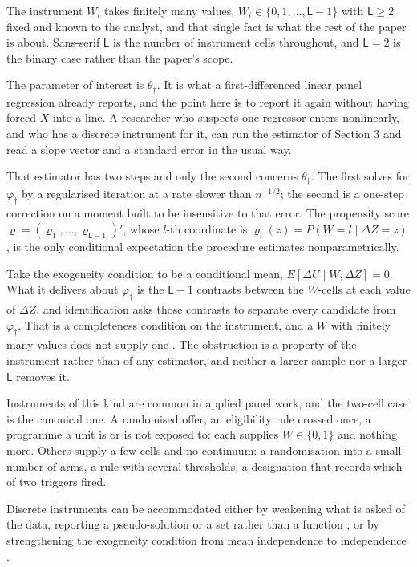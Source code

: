 \documentclass[
  12pt]{article}
\newcommand{\1}[1]{\mathds{1}\left[#1\right]}
\theoremstyle{plain}
\theoremstyle{definition}
\theoremstyle{definition}
\theoremstyle{remark}
\newcommand{\vdagger}{\varphi_{\dagger}}
\begin{document}
The instrument \(W_i\) takes finitely many values,
\(W_i\in\{0,1,\dots,\mathsf L-1\}\) with \(\mathsf L\ge2\) fixed and
known to the analyst, and that single fact is what the rest of the paper
is about. Sans-serif \(\mathsf L\) is the number of instrument cells
throughout, and \(\mathsf L=2\) is the binary case rather than the
paper's scope.

The parameter of interest is \(\theta_\dagger\). It is what a
first-differenced linear panel regression already reports, and the point
here is to report it again without having forced \(X\) into a line. A
researcher who suspects one regressor enters nonlinearly, and who has a
discrete instrument for it, can run the estimator of Section 3 and read
a slope vector and a standard error in the usual way.

That estimator has two steps and only the second concerns
\(\theta_\dagger\). The first solves for \(\vdagger\) by a regularised
iteration at a rate slower than \(n^{-1/2}\); the second is a one-step
correction on a moment built to be insensitive to that error. The
propensity score \(\varrho=(\varrho_1,\dots,\varrho_{\mathsf L-1})'\),
whose \(l\)-th coordinate is \(\varrho_l(z)=P(W=l\mid\Delta Z=z)\), is
the only conditional expectation the procedure estimates
nonparametrically.

Take the exogeneity condition to be a conditional mean,
\(E[\Delta U\mid W,\Delta Z]=0\). What it delivers about \(\vdagger\) is
the \(\mathsf L-1\) contrasts between the \(W\)-cells at each value of
\(\Delta Z\), and identification asks those contrasts to separate every
candidate from \(\vdagger\). That is a completeness condition on the
instrument, and a \(W\) with finitely many values does not supply one
\citep[see][]{dominguezlobato2004,severini2006}. The obstruction is a
property of the instrument rather than of any estimator, and neither a
larger sample nor a larger \(\mathsf L\) removes it.

Instruments of this kind are common in applied panel work, and the
two-cell case is the canonical one. A randomised offer, an eligibility
rule crossed once, a programme a unit is or is not exposed to: each
supplies \(W\in\{0,1\}\) and nothing more. Others supply a few cells and
no continuum: a randomisation into a small number of arms, a rule with
several thresholds, a designation that records which of two triggers
fired.

Discrete instruments can be accommodated either by weakening what is
asked of the data, reporting a pseudo-solution or a set rather than a
function \citep[see][]{babiiflorens2025,chenq2021}; or by strengthening
the exogeneity condition from mean independence to independence
\citep[see][among others]{centorrinofeveflorens2019,dunker2014,dunker2021}.
\end{document}
